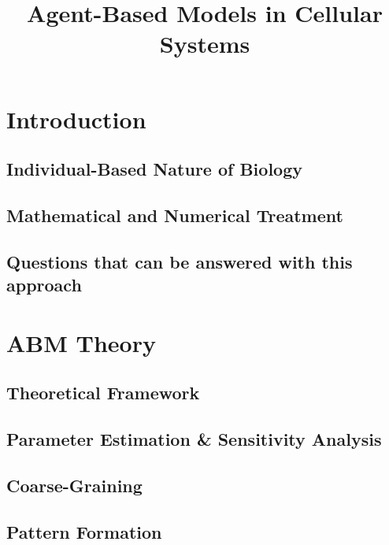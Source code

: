 \documentclass[a4paper]{article}
\title{Agent-Based Models in Cellular Systems}
\begin{document}

\maketitle

\pagebreak
\tableofcontents

\begin{abstract}
\end{abstract}

\section{Introduction}
\subsection{Individual-Based Nature of Biology}
\subsection{Mathematical and Numerical Treatment}
\subsection{Questions that can be answered with this approach}

\section{ABM Theory}
\subsection{Theoretical Framework}
\subsection{Parameter Estimation \& Sensitivity Analysis}
\subsection{Coarse-Graining}
\subsection{Pattern Formation}
\end{document}
